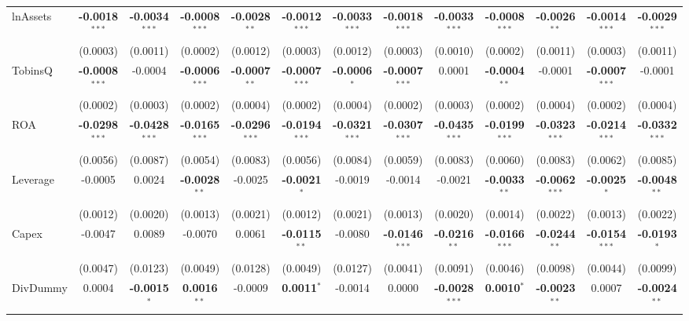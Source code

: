 \documentclass[11pt,a4paper]{article}
\begin{document}
\begin{table}[htbp]
\begin{tabular}{lcccccccccccc}
\midrule
lnAssets & \textbf{-0.0018}$^{***}$ & \textbf{-0.0034}$^{***}$ & \textbf{-0.0008}$^{***}$ & \textbf{-0.0028}$^{**}$ & \textbf{-0.0012}$^{***}$ & \textbf{-0.0033}$^{***}$ & \textbf{-0.0018}$^{***}$ & \textbf{-0.0033}$^{***}$ & \textbf{-0.0008}$^{***}$ & \textbf{-0.0026}$^{**}$ & \textbf{-0.0014}$^{***}$ & \textbf{-0.0029}$^{***}$ \\
 & (0.0003) & (0.0011) & (0.0002) & (0.0012) & (0.0003) & (0.0012) & (0.0003) & (0.0010) & (0.0002) & (0.0011) & (0.0003) & (0.0011) \\
TobinsQ & \textbf{-0.0008}$^{***}$ & -0.0004 & \textbf{-0.0006}$^{***}$ & \textbf{-0.0007}$^{**}$ & \textbf{-0.0007}$^{***}$ & \textbf{-0.0006}$^{*}$ & \textbf{-0.0007}$^{***}$ & 0.0001 & \textbf{-0.0004}$^{**}$ & -0.0001 & \textbf{-0.0007}$^{***}$ & -0.0001 \\
 & (0.0002) & (0.0003) & (0.0002) & (0.0004) & (0.0002) & (0.0004) & (0.0002) & (0.0003) & (0.0002) & (0.0004) & (0.0002) & (0.0004) \\
ROA & \textbf{-0.0298}$^{***}$ & \textbf{-0.0428}$^{***}$ & \textbf{-0.0165}$^{***}$ & \textbf{-0.0296}$^{***}$ & \textbf{-0.0194}$^{***}$ & \textbf{-0.0321}$^{***}$ & \textbf{-0.0307}$^{***}$ & \textbf{-0.0435}$^{***}$ & \textbf{-0.0199}$^{***}$ & \textbf{-0.0323}$^{***}$ & \textbf{-0.0214}$^{***}$ & \textbf{-0.0332}$^{***}$ \\
 & (0.0056) & (0.0087) & (0.0054) & (0.0083) & (0.0056) & (0.0084) & (0.0059) & (0.0083) & (0.0060) & (0.0083) & (0.0062) & (0.0085) \\
Leverage & -0.0005 & 0.0024 & \textbf{-0.0028}$^{**}$ & -0.0025 & \textbf{-0.0021}$^{*}$ & -0.0019 & -0.0014 & -0.0021 & \textbf{-0.0033}$^{**}$ & \textbf{-0.0062}$^{***}$ & \textbf{-0.0025}$^{*}$ & \textbf{-0.0048}$^{**}$ \\
 & (0.0012) & (0.0020) & (0.0013) & (0.0021) & (0.0012) & (0.0021) & (0.0013) & (0.0020) & (0.0014) & (0.0022) & (0.0013) & (0.0022) \\
Capex & -0.0047 & 0.0089 & -0.0070 & 0.0061 & \textbf{-0.0115}$^{**}$ & -0.0080 & \textbf{-0.0146}$^{***}$ & \textbf{-0.0216}$^{**}$ & \textbf{-0.0166}$^{***}$ & \textbf{-0.0244}$^{**}$ & \textbf{-0.0154}$^{***}$ & \textbf{-0.0193}$^{*}$ \\
 & (0.0047) & (0.0123) & (0.0049) & (0.0128) & (0.0049) & (0.0127) & (0.0041) & (0.0091) & (0.0046) & (0.0098) & (0.0044) & (0.0099) \\
DivDummy & 0.0004 & \textbf{-0.0015}$^{*}$ & \textbf{0.0016}$^{**}$ & -0.0009 & \textbf{0.0011}$^{*}$ & -0.0014 & 0.0000 & \textbf{-0.0028}$^{***}$ & \textbf{0.0010}$^{*}$ & \textbf{-0.0023}$^{**}$ & 0.0007 & \textbf{-0.0024}$^{**}$ \\

\end{tabular}
\end{table}
\end{document}
